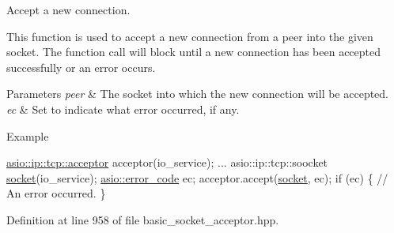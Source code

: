 Accept a new connection. 

This function is used to accept a new connection from a peer into the given socket. The function call will block until a new connection has been accepted successfully or an error occurs.


\begin{DoxyParams}{Parameters}
{\em peer} & The socket into which the new connection will be accepted.\\
\hline
{\em ec} & Set to indicate what error occurred, if any.\\
\hline
\end{DoxyParams}
\begin{DoxyParagraph}{Example}

\begin{DoxyCode}
\hyperlink{classasio_1_1basic__socket__acceptor}{asio::ip::tcp::acceptor} acceptor(io\_service);
...
asio::ip::tcp::soocket \hyperlink{namespacewebsocketpp_1_1transport_1_1asio_1_1socket_1_1error_a828ddaa5ed63a761e1b557465a35f05aa0c31b356014843e1d09514e794a539a7}{socket}(io\_service);
\hyperlink{classasio_1_1error__code}{asio::error\_code} ec;
acceptor.accept(\hyperlink{namespacewebsocketpp_1_1transport_1_1asio_1_1socket_1_1error_a828ddaa5ed63a761e1b557465a35f05aa0c31b356014843e1d09514e794a539a7}{socket}, ec);
\textcolor{keywordflow}{if} (ec)
\{
  \textcolor{comment}{// An error occurred.}
\}
\end{DoxyCode}
 
\end{DoxyParagraph}


Definition at line 958 of file basic\+\_\+socket\+\_\+acceptor.\+hpp.

\hypertarget{classasio_1_1basic__socket__acceptor_a2655c81c8150a6d9470ea318ab08b7ea}{}
